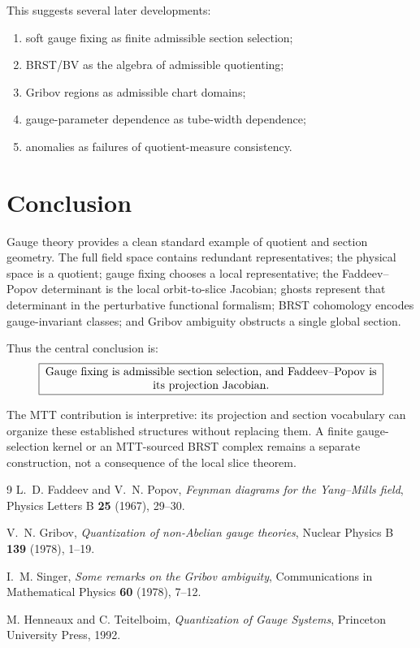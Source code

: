 \documentclass[11pt]{article}
\begin{document}
This suggests several later developments:

\begin{enumerate}
\item soft gauge fixing as finite admissible section selection;
\item BRST/BV as the algebra of admissible quotienting;
\item Gribov regions as admissible chart domains;
\item gauge-parameter dependence as tube-width dependence;
\item anomalies as failures of quotient-measure consistency.
\end{enumerate}

\section{Conclusion}

Gauge theory provides a clean standard example of quotient and section
geometry.  The full field space contains redundant representatives; the
physical space is a quotient; gauge fixing chooses a local representative;
the Faddeev--Popov determinant is the local orbit-to-slice Jacobian; ghosts
represent that determinant in the perturbative functional formalism; BRST
cohomology encodes gauge-invariant classes; and Gribov ambiguity obstructs a
single global section.

Thus the central conclusion is:
\[
\boxed{
\begin{minipage}{0.86\textwidth}
\centering
Gauge fixing is admissible section selection, and Faddeev--Popov is its projection Jacobian.
\end{minipage}
}
\]

The MTT contribution is interpretive: its projection and section vocabulary
can organize these established structures without replacing them.  A finite
gauge-selection kernel or an MTT-sourced BRST complex remains a separate
construction, not a consequence of the local slice theorem.

\begin{thebibliography}{9}
L.~D. Faddeev and V.~N. Popov,
\emph{Feynman diagrams for the Yang--Mills field},
Physics Letters B \textbf{25} (1967), 29--30.

V.~N. Gribov,
\emph{Quantization of non-Abelian gauge theories},
Nuclear Physics B \textbf{139} (1978), 1--19.

I.~M. Singer,
\emph{Some remarks on the Gribov ambiguity},
Communications in Mathematical Physics \textbf{60} (1978), 7--12.

M. Henneaux and C. Teitelboim,
\emph{Quantization of Gauge Systems},
Princeton University Press, 1992.
\end{thebibliography}
\end{document}
